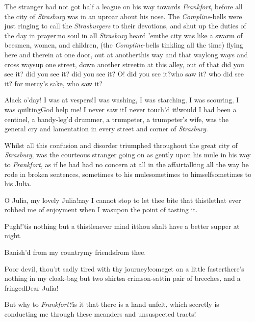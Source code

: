 \documentclass{article}
\begin{document}
The stranger had not got half a league on his way towards
\textit{Frankfort}, before all the city of \textit{Strasburg} was in an
uproar about his nose. The \textit{Compline}-bells were just ringing
to call the \textit{Strasburgers} to\break
their devotions, and shut up the
duties of the day in prayer:\tsk no soul in all \textit{Strasburg}
heard ’em\tsk the city was like a swarm of
bees\tsh men, women, and children, (the
\textit{Compline}-bells tinkling all the time) flying here
and there\tsk in at one door, out at another\tsk this way
and that way\tsk long ways and cross ways\tsk up one street,
down another street\tsk in at this alley, out of that\tsh
did you see it? did you see it? did you see it? O! did you
see it?\tsh who saw it? who did see it? for mercy’s sake,
who saw it?

Alack o’day! I was at vespers!\tsk I was washing, I was
starching, I was
scouring, I was quilting\tsk God help me!  I never saw
it\tsk I never touch’d it!\tsh would I had been a centinel,
a bandy-leg’d drummer, a trumpeter, a trumpe\-ter’s wife, was
the general cry and la\-men\-t\-ation in every street and corner
of\break
\textit{Strasburg}.

Whilst all this confusion and disorder triumphed throughout the
great city of \textit{Strasburg}, was the courteous stranger going on
as gently upon his mule in his way to \textit{Frankfort}, as if he
had had no concern at all in the affair\tsh talking all the
way he rode in broken sentences, sometimes to his
mule\tsk sometimes to himself\tsh sometimes to his Julia.

O Julia, my lovely Julia!\tsk nay I cannot stop to let thee
bite that thistle\tsk that ever 
robbed me of enjoyment when I was\break upon the point
of tasting it.\tsk

\tsk Pugh!\tsk ’tis nothing but a thistle\tsk never mind
it\tsk thou shalt have a better supper at night.\tsk

\tsh Banish’d from my country\tsk my friends\tsk from thee.\tsk

Poor devil, thou’rt sadly tired with\break
thy journey!\tsk come\tsk get on a little faster\tsk there’s nothing in my
cloak-bag but two shirts\tsk a crimson-sattin pair of
breeches, and a fringed\tsk Dear Julia!

\tsh But why to \textit{Frankfort?}\tsk is it that there is
a hand unfelt, which secretly is conducting me through these
meanders and unsuspected tracts!\tsk{}
\end{document}
